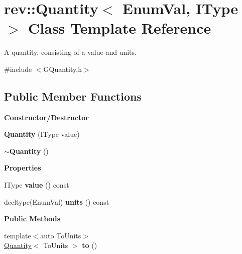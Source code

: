 \hypertarget{classrev_1_1_quantity}{}\section{rev\+::Quantity$<$ Enum\+Val, I\+Type $>$ Class Template Reference}
\label{classrev_1_1_quantity}


A quantity, consisting of a value and units.  




{\ttfamily \#include $<$G\+Quantity.\+h$>$}

\subsection*{Public Member Functions}
\begin{Indent}\textbf{ Constructor/\+Destructor}\par
\begin{DoxyCompactItemize}
\item 
\mbox{\label{classrev_1_1_quantity_a4c5e726ef231caf7a5568061d32b2d6f}} 
{\bfseries Quantity} (I\+Type value)
\item 
\mbox{\label{classrev_1_1_quantity_a3a3354d3c56dfcf9d6b67e5e6d0425f9}} 
{\bfseries $\sim$\+Quantity} ()
\end{DoxyCompactItemize}
\end{Indent}
\begin{Indent}\textbf{ Properties}\par
\begin{DoxyCompactItemize}
\item 
\mbox{\label{classrev_1_1_quantity_ad9fbe956ade91e4908d8523bd2111800}} 
I\+Type {\bfseries value} () const
\item 
\mbox{\label{classrev_1_1_quantity_addec9794f58b5b6c4263ce712706f24b}} 
decltype(Enum\+Val) {\bfseries units} () const
\end{DoxyCompactItemize}
\end{Indent}
\begin{Indent}\textbf{ Public Methods}\par
\begin{DoxyCompactItemize}
\item 
\mbox{\label{classrev_1_1_quantity_a91e8bb6cb84dab0bd6688f47f06c1834}} 
{\footnotesize template$<$auto To\+Units$>$ }\\\mbox{\hyperlink{classrev_1_1_quantity}{Quantity}}$<$ To\+Units $>$ {\bfseries to} ()
\end{DoxyCompactItemize}
\end{Indent}

